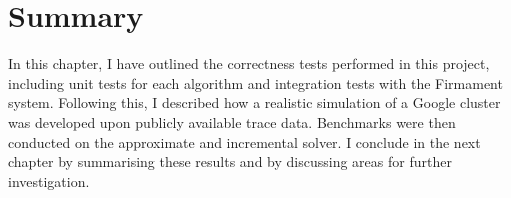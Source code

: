 
%
%
%
%
%
%
%
%
%
%

\section{Summary}

In this chapter, I have outlined the correctness tests performed in this project, including unit tests for each algorithm and integration tests with the Firmament system. Following this, I described how a realistic simulation of a Google cluster was developed upon publicly available trace data. Benchmarks were then conducted on the approximate and incremental solver. I conclude in the next chapter by summarising these results and by discussing areas for further investigation.